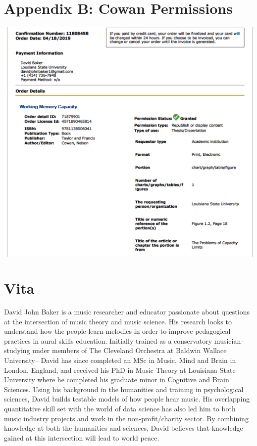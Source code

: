 \documentclass[12pt,]{book}
\begin{document}
\chapter{Appendix B: Cowan Permissions}

\thispagestyle{empty}
\begin{center}
\includegraphics{img/cownpermission.png}
\end{center}

\chapter{Vita}

\doublespacing

David John Baker is a music researcher and educator passionate about questions at the intersection of music theory and music science.
His research looks to understand how the people learn melodies in order to improve pedagogical practices in aural skills education.
Initially trained as a conservatory musician-- studying under members of The Cleveland Orchestra at Baldwin Wallace University-- David has since completed an MSc in Music, Mind and Brain in London, England, and received his PhD in Music Theory at Louisiana State University where he completed his graduate minor in Cognitive and Brain Sciences.
Using his background in the humanities and training in psychological sciences, David builds testable models of how people hear music.
His overlapping quantitative skill set with the world of data science has also led him to both music industry projects and work in the non-profit/charity sector.
By combining knowledge at both the humanities and sciences, David believes that knowledge gained at this intersection will lead to world peace.
\end{document}
